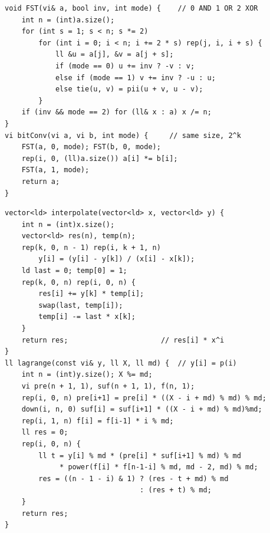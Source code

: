 \begin{lstlisting}
void FST(vi& a, bool inv, int mode) {    // 0 AND 1 OR 2 XOR
    int n = (int)a.size();
    for (int s = 1; s < n; s *= 2)
        for (int i = 0; i < n; i += 2 * s) rep(j, i, i + s) {
            ll &u = a[j], &v = a[j + s];
            if (mode == 0) u += inv ? -v : v;
            else if (mode == 1) v += inv ? -u : u;
            else tie(u, v) = pii(u + v, u - v);
        }
    if (inv && mode == 2) for (ll& x : a) x /= n;
}
vi bitConv(vi a, vi b, int mode) {     // same size, 2^k
    FST(a, 0, mode); FST(b, 0, mode);
    rep(i, 0, (ll)a.size()) a[i] *= b[i];
    FST(a, 1, mode);
    return a;
}
\end{lstlisting}


\begin{lstlisting}
vector<ld> interpolate(vector<ld> x, vector<ld> y) {
    int n = (int)x.size();
    vector<ld> res(n), temp(n);
    rep(k, 0, n - 1) rep(i, k + 1, n)
        y[i] = (y[i] - y[k]) / (x[i] - x[k]);
    ld last = 0; temp[0] = 1;
    rep(k, 0, n) rep(i, 0, n) {
        res[i] += y[k] * temp[i];
        swap(last, temp[i]);
        temp[i] -= last * x[k];
    }
    return res;                      // res[i] * x^i
}
ll lagrange(const vi& y, ll X, ll md) {  // y[i] = p(i)
    int n = (int)y.size(); X %= md;
    vi pre(n + 1, 1), suf(n + 1, 1), f(n, 1);
    rep(i, 0, n) pre[i+1] = pre[i] * ((X - i + md) % md) % md;
    down(i, n, 0) suf[i] = suf[i+1] * ((X - i + md) % md)%md;
    rep(i, 1, n) f[i] = f[i-1] * i % md;
    ll res = 0;
    rep(i, 0, n) {
        ll t = y[i] % md * (pre[i] * suf[i+1] % md) % md
             * power(f[i] * f[n-1-i] % md, md - 2, md) % md;
        res = ((n - 1 - i) & 1) ? (res - t + md) % md
                                : (res + t) % md;
    }
    return res;
}
\end{lstlisting}


